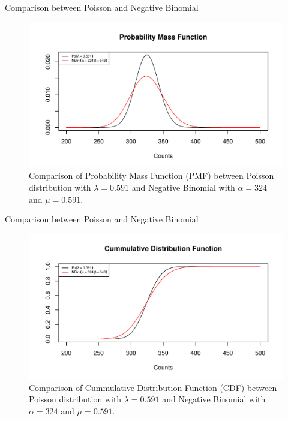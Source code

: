 \documentclass[english]{beamer}\usepackage[]{graphicx}\usepackage[]{xcolor}
\makeatletter
\def\maxwidth{ %
  \ifdim\Gin@nat@width>\linewidth
    \linewidth
  \else
    \Gin@nat@width
  \fi
}
\newenvironment{knitrout}{}{} %
\makeatother
\begin{document}
\begin{frame}{Comparison between Poisson and Negative Binomial}
\begin{figure}
\begin{knitrout}
\color{fgcolor}
\includegraphics[width=\maxwidth]{figures/figunnamed-chunk-9-1} 
\end{knitrout}
  \caption{Comparison of Probability Mass Function (PMF) between Poisson distribution with $\lambda = 0.591$ and Negative Binomial with $\alpha = 324$ and $\mu = 0.591$.}
  \label{fig:2_6}
\end{figure}
\end{frame}


\begin{frame}{Comparison between Poisson and Negative Binomial}

\begin{figure}
\begin{knitrout}
\color{fgcolor}
\includegraphics[width=\maxwidth]{figures/figunnamed-chunk-10-1} 
\end{knitrout}
  \caption{Comparison of Cummulative Distribution Function (CDF) between Poisson distribution with $\lambda = 0.591$ and Negative Binomial with $\alpha = 324$ and $\mu = 0.591$.}
  \label{fig:2_7}
\end{figure}

\end{frame}
\end{document}
